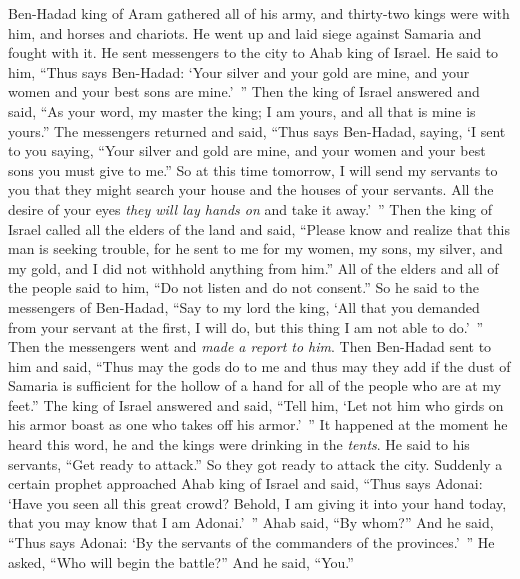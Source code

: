 \begin{biblechapter} %
 Ben-Hadad king of Aram gathered all of his army, and thirty-two kings were with him, and horses and chariots. He went up and laid siege against Samaria and fought with it.
\verse He sent messengers to the city to Ahab king of Israel.
\verse He said to him, “Thus says Ben-Hadad: ‘Your silver and your gold are mine, and your women and your best sons are mine.’ ”
\verse Then the king of Israel answered and said, “As your word, my master the king; I am yours, and all that is mine is yours.”
\verse The messengers returned and said, “Thus says Ben-Hadad, saying, ‘I sent to you saying, “Your silver and gold are mine, and your women and your best sons you must give to me.”
\verse So at this time tomorrow, I will send my servants to you that they might search your house and the houses of your servants. All the desire of your eyes \textit{they will lay hands on} and take it away.’ ”
\verse Then the king of Israel called all the elders of the land and said, “Please know and realize that this man is seeking trouble, for he sent to me for my women, my sons, my silver, and my gold, and I did not withhold anything from him.”
\verse All of the elders and all of the people said to him, “Do not listen and do not consent.”
\verse So he said to the messengers of Ben-Hadad, “Say to my lord the king, ‘All that you demanded from your servant at the first, I will do, but this thing I am not able to do.’ ” Then the messengers went and \textit{made a report to him}.
\verse Then Ben-Hadad sent to him and said, “Thus may the gods do to me and thus may they add if the dust of Samaria is sufficient for the hollow of a hand for all of the people who are at my feet.”
\verse The king of Israel answered and said, “Tell him, ‘Let not him who girds on his armor boast as one who takes off his armor.’ ”
\verse It happened at the moment he heard this word, he and the kings were drinking in the \textit{tents}. He said to his servants, “Get ready to attack.” So they got ready to attack the city.
\verse Suddenly a certain prophet approached Ahab king of Israel and said, “Thus says Adonai: ‘Have you seen all this great crowd? Behold, I am giving it into your hand today, that you may know that I am Adonai.’ ”
\verse Ahab said, “By whom?” And he said, “Thus says Adonai: ‘By the servants of the commanders of the provinces.’ ” He asked, “Who will begin the battle?” And he said, “You.”

\end{biblechapter}
